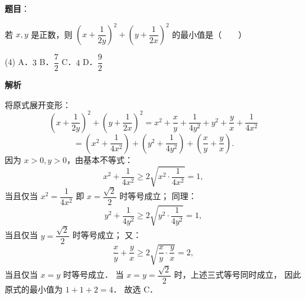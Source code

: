 \begin{answer}

\textbf{题目}：

若 $x, y$ 是正数，则 $\left(x + \dfrac{1}{2y}\right)^2 + \left(y + \dfrac{1}{2x}\right)^2$ 的最小值是\mbox{（　　）}

\begin{gkopts}(4)
\task A．$3$
\task B．$\dfrac{7}{2}$
\task C．$4$
\task D．$\dfrac{9}{2}$
\end{gkopts}

\textbf{解析}

将原式展开变形：
\nopagebreak[4]
\[
\left(x + \frac{1}{2y}\right)^2 + \left(y + \frac{1}{2x}\right)^2 = x^2 + \frac{x}{y} + \frac{1}{4y^2} + y^2 + \frac{y}{x} + \frac{1}{4x^2}
\]
\nopagebreak[4]
\[
= \left(x^2 + \frac{1}{4x^2}\right) + \left(y^2 + \frac{1}{4y^2}\right) + \left(\frac{x}{y} + \frac{y}{x}\right).
\]
因为 $x > 0, y > 0$，由基本不等式：
\nopagebreak[4]
\[
x^2 + \frac{1}{4x^2} \geqslant 2\sqrt{x^2 \cdot \frac{1}{4x^2}} = 1,
\]
当且仅当 $x^2 = \dfrac{1}{4x^2}$ 即 $x = \dfrac{\sqrt{2}}{2}$ 时等号成立；
同理：
\nopagebreak[4]
\[
y^2 + \frac{1}{4y^2} \geqslant 2\sqrt{y^2 \cdot \frac{1}{4y^2}} = 1,
\]
当且仅当 $y = \dfrac{\sqrt{2}}{2}$ 时等号成立；
又：
\nopagebreak[4]
\[
\frac{x}{y} + \frac{y}{x} \geqslant 2\sqrt{\frac{x}{y} \cdot \frac{y}{x}} = 2,
\]
当且仅当 $x = y$ 时等号成立．
当 $x = y = \dfrac{\sqrt{2}}{2}$ 时，上述三式等号同时成立，
因此原式的最小值为 $1 + 1 + 2 = 4$．
故选 C．


\end{answer}
